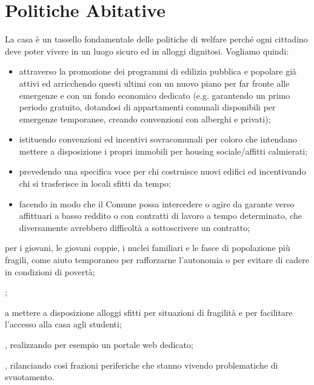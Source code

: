 \section{Politiche Abitative}
La casa è un tassello fondamentale delle politiche di welfare perché ogni cittadino deve poter vivere in un luogo sicuro ed in alloggi dignitosi. Vogliamo quindi:

\begin{bluebox}
\begin{itemize}
  \item attraverso la promozione dei programmi di edilizia pubblica e popolare già attivi ed arricchendo questi ultimi con un nuovo piano per far fronte alle emergenze e con un fondo economico dedicato (e.g. garantendo un primo periodo gratuito, dotandosi di appartamenti comunali disponibili per emergenze temporanee, creando convenzioni con alberghi e privati);
  \pagebreak
  \item istituendo convenzioni ed incentivi sovracomunali per coloro che intendano mettere a disposizione i propri immobili per housing sociale/affitti calmierati;
  \item prevedendo una specifica voce per chi costruisce nuovi edifici ed incentivando chi si trasferisce in locali sfitti da tempo;
  \item facendo in modo che il Comune possa intercedere o agire da garante verso affittuari a basso reddito o con contratti di lavoro a  tempo determinato, che diversamente avrebbero difficoltà a sottoscrivere un contratto;
\end{itemize}
\end{bluebox}

per i giovani, le giovani coppie, i nuclei familiari e le fasce di popolazione più fragili, come aiuto temporaneo per rafforzarne l'autonomia o per evitare di cadere in condizioni di povertà;

;

 a mettere a disposizione alloggi sfitti per situazioni di fragilità e per facilitare l'accesso alla casa agli studenti;

, realizzando per esempio un portale web dedicato;

, rilanciando così frazioni periferiche che stanno vivendo problematiche di svuotamento.
